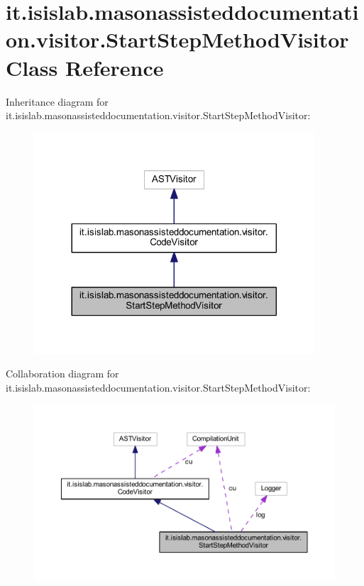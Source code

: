 \hypertarget{classit_1_1isislab_1_1masonassisteddocumentation_1_1visitor_1_1_start_step_method_visitor}{\section{it.\-isislab.\-masonassisteddocumentation.\-visitor.\-Start\-Step\-Method\-Visitor Class Reference}
\label{classit_1_1isislab_1_1masonassisteddocumentation_1_1visitor_1_1_start_step_method_visitor}
}


Inheritance diagram for it.\-isislab.\-masonassisteddocumentation.\-visitor.\-Start\-Step\-Method\-Visitor\-:
\nopagebreak
\begin{figure}[H]
\begin{center}
\leavevmode
\includegraphics[width=296pt]{classit_1_1isislab_1_1masonassisteddocumentation_1_1visitor_1_1_start_step_method_visitor__inherit__graph}
\end{center}
\end{figure}


Collaboration diagram for it.\-isislab.\-masonassisteddocumentation.\-visitor.\-Start\-Step\-Method\-Visitor\-:
\nopagebreak
\begin{figure}[H]
\begin{center}
\leavevmode
\includegraphics[width=350pt]{classit_1_1isislab_1_1masonassisteddocumentation_1_1visitor_1_1_start_step_method_visitor__coll__graph}
\end{center}
\end{figure}
